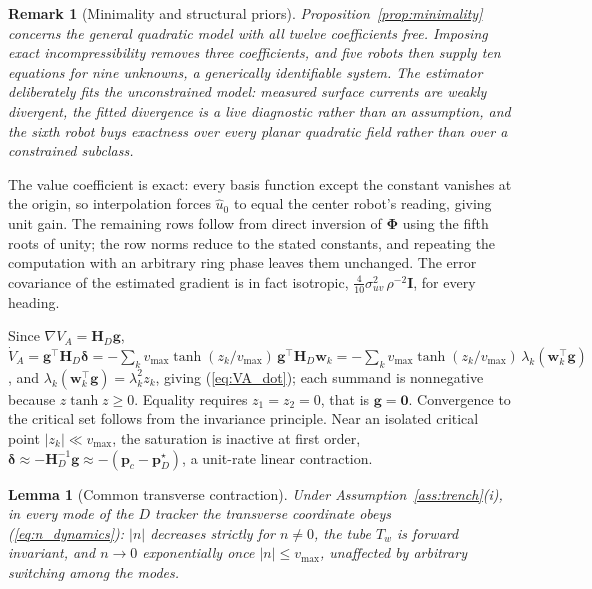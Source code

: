 \documentclass[lettersize,journal]{IEEEtran}
\newtheorem{lemma}{Lemma}
\newtheorem{remark}{Remark}
\begin{document}
\begin{remark}[Minimality and structural priors]
\label{rem:minimality_priors}
Proposition~\ref{prop:minimality} concerns the general quadratic model
with all twelve coefficients free. Imposing exact incompressibility
removes three coefficients, and five robots then supply ten equations
for nine unknowns, a generically identifiable system. The estimator
deliberately fits the unconstrained model: measured surface currents
are weakly divergent, the fitted divergence is a live diagnostic rather
than an assumption, and the sixth robot buys exactness over every
planar quadratic field rather than over a constrained subclass.
\end{remark}

\begin{IEEEproof}
The value coefficient is exact: every basis function except the constant
vanishes at the origin, so interpolation forces $\hat{u}_0$ to equal the
center robot's reading, giving unit gain. The remaining rows follow from
direct inversion of $\boldsymbol{\Phi}$ using the fifth roots of unity;
the row norms reduce to the stated constants, and repeating the
computation with an arbitrary ring phase leaves them unchanged. The
error covariance of the estimated gradient is in fact isotropic,
$\tfrac{4}{10}\sigma_{uv}^2\,\rho^{-2}\mathbf{I}$, for every heading.
\end{IEEEproof}

\begin{IEEEproof}
Since $\nabla V_A = \mathbf{H}_D \mathbf{g}$,
$\dot{V}_A = \mathbf{g}^\top \mathbf{H}_D \boldsymbol{\delta}
= -\sum_k v_{\max} \tanh(z_k/v_{\max})\,
\mathbf{g}^\top \mathbf{H}_D \mathbf{w}_k
= -\sum_k v_{\max} \tanh(z_k/v_{\max})\,\lambda_k
(\mathbf{w}_k^\top\mathbf{g})$, and $\lambda_k(\mathbf{w}_k^\top
\mathbf{g}) = \lambda_k^2 z_k$, giving (\ref{eq:VA_dot}); each summand
is nonnegative because $z\tanh z \geq 0$. Equality requires $z_1 = z_2 =
0$, that is $\mathbf{g} = \mathbf{0}$. Convergence to the critical set
follows from the invariance principle. Near an isolated critical point
$|z_k| \ll v_{\max}$, the saturation is inactive at first order,
$\boldsymbol{\delta} \approx -\mathbf{H}_D^{-1}\mathbf{g} \approx
-(\mathbf{p}_c - \mathbf{p}^\star_D)$, a unit-rate linear contraction.
\end{IEEEproof}

\begin{lemma}[Common transverse contraction]
\label{lem:transverse}
Under Assumption~\ref{ass:trench}(i), in every mode of the $D$ tracker
the transverse coordinate obeys (\ref{eq:n_dynamics}): $|n|$ decreases
strictly for $n \neq 0$, the tube $T_w$ is forward invariant, and
$n \to 0$ exponentially once $|n| \leq v_{\max}$, unaffected by
arbitrary switching among the modes.
\end{lemma}
\end{document}
